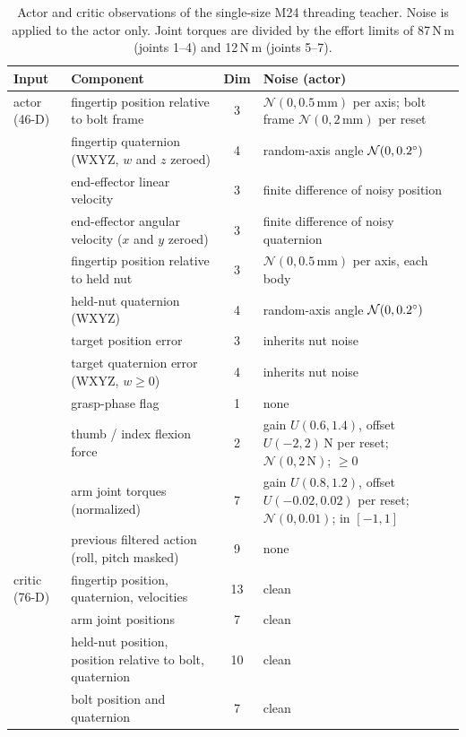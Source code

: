 \begin{table}[!htbp]%
    \centering%
    \caption{Actor and critic observations of the single-size M24 threading teacher. Noise is applied to the actor only. Joint torques are divided by the effort limits of 87\,N\,m (joints 1--4) and 12\,N\,m (joints 5--7).}%
    \label{tab:teacher-obs}%
    \small
\begin{tabularx}{\textwidth}{lYcY}
        \toprule
        Input & Component & Dim & Noise (actor) \\
        \midrule
        actor (46-D) & fingertip position relative to bolt frame & 3 & $\mathcal{N}(0,0.5\,\mathrm{mm})$ per axis; bolt frame $\mathcal{N}(0,2\,\mathrm{mm})$ per reset \\
         & fingertip quaternion (WXYZ, $w$ and $z$ zeroed) & 4 & random-axis angle $\mathcal{N}(0,0.2^\circ)$ \\
         & end-effector linear velocity & 3 & finite difference of noisy position \\
         & end-effector angular velocity ($x$ and $y$ zeroed) & 3 & finite difference of noisy quaternion \\
         & fingertip position relative to held nut & 3 & $\mathcal{N}(0,0.5\,\mathrm{mm})$ per axis, each body \\
         & held-nut quaternion (WXYZ) & 4 & random-axis angle $\mathcal{N}(0,0.2^\circ)$ \\
         & target position error & 3 & inherits nut noise \\
         & target quaternion error (WXYZ, $w\geq0$) & 4 & inherits nut noise \\
         & grasp-phase flag & 1 & none \\
         & thumb / index flexion force & 2 & gain $U(0.6,1.4)$, offset $U(-2,2)$\,N per reset; $\mathcal{N}(0,2\,\mathrm{N})$; $\ge0$ \\
         & arm joint torques (normalized) & 7 & gain $U(0.8,1.2)$, offset $U(-0.02,0.02)$ per reset; $\mathcal{N}(0,0.01)$; in $[-1,1]$ \\
         & previous filtered action (roll, pitch masked) & 9 & none \\
        \midrule
        critic (76-D) & fingertip position, quaternion, velocities & 13 & clean \\
         & arm joint positions & 7 & clean \\
         & held-nut position, position relative to bolt, quaternion & 10 & clean \\
         & bolt position and quaternion & 7 & clean \\

\end{tabularx}
\end{table}
